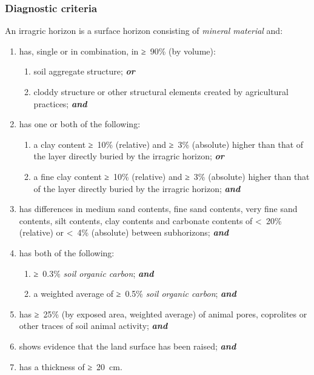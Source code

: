 \documentclass[
  letterpaper,
  DIV=11,
  numbers=noendperiod]{scrreprt}
\providecommand{\tightlist}{%
  \setlength{\itemsep}{0pt}\setlength{\parskip}{0pt}}\usepackage{longtable,booktabs,array}
\begin{document}
\hypertarget{diagnostic-criteria-17}{%
\subsubsection{Diagnostic criteria}\label{diagnostic-criteria-17}}

An irragric horizon is a surface horizon consisting of \emph{mineral
material} and:

\begin{enumerate}
\def\labelenumi{\arabic{enumi}.}
\item
  has, single or in combination, in ≥~90\% (by volume):

  \begin{enumerate}
  \def\labelenumii{\alph{enumii}.}
  \tightlist
  \item
    soil aggregate structure; \textbf{\emph{or}}
  \item
    cloddy structure or other structural elements created by
    agricultural practices; \textbf{\emph{and}}
  \end{enumerate}
\item
  has one or both of the following:

  \begin{enumerate}
  \def\labelenumii{\alph{enumii}.}
  \tightlist
  \item
    a clay content ≥~10\% (relative) and ≥~3\% (absolute) higher than
    that of the layer directly buried by the irragric horizon;
    \textbf{\emph{or}}
  \item
    a fine clay content ≥~10\% (relative) and ≥~3\% (absolute) higher
    than that of the layer directly buried by the irragric horizon;
    \textbf{\emph{and}}
  \end{enumerate}
\item
  has differences in medium sand contents, fine sand contents, very fine
  sand contents, silt contents, clay contents and carbonate contents of
  \textless~20\% (relative) or \textless~4\% (absolute) between
  subhorizons; \textbf{\emph{and}}
\item
  has both of the following:

  \begin{enumerate}
  \def\labelenumii{\alph{enumii}.}
  \item
    ≥~0.3\% \emph{soil organic carbon}; \textbf{\emph{and}}
  \item
    a weighted average of ≥~0.5\% \emph{soil organic carbon};
    \textbf{\emph{and}}
  \end{enumerate}
\item
  has ≥~25\% (by exposed area, weighted average) of animal pores,
  coprolites or other traces of soil animal activity;
  \textbf{\emph{and}}
\item
  shows evidence that the land surface has been raised;
  \textbf{\emph{and}}
\item
  has a thickness of ≥~20~cm.
\end{enumerate}
\end{document}
